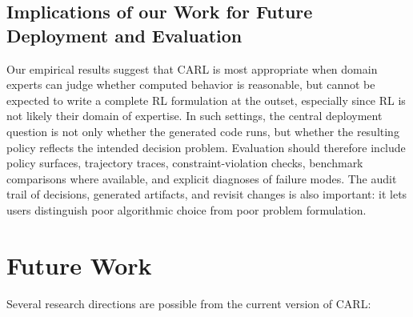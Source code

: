 \documentclass[mnsc,sglanonrev]{informs4}
\begin{document}
\subsection{Implications of our Work for Future Deployment and Evaluation}

Our empirical results suggest that CARL is most appropriate when domain experts can judge whether computed behavior is reasonable, but cannot be expected to write a complete RL formulation at the outset, especially since RL is not likely their domain of expertise. In such settings, the central deployment question is not only whether the generated code runs, but whether the resulting policy reflects the intended decision problem. Evaluation should therefore include policy surfaces, trajectory traces, constraint-violation checks, benchmark comparisons where available, and explicit diagnoses of failure modes. The audit trail of decisions, generated artifacts, and revisit changes is also important: it lets users distinguish poor algorithmic choice from poor problem formulation. 


\section{Future Work} \label{sec:future}

Several research directions are possible from the current version of CARL:
\end{document}
